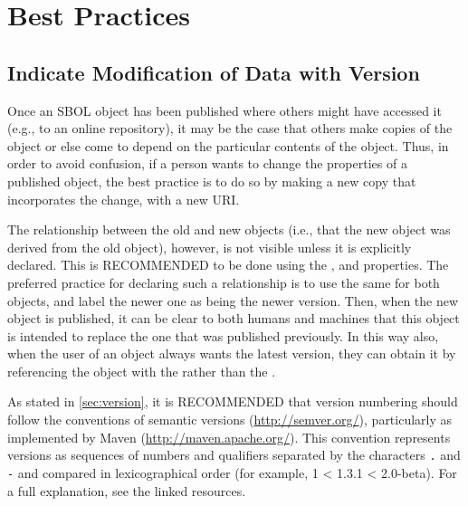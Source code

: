 \section{Best Practices}
\label{sec:bestpractices}
\subsection{Indicate Modification of Data with Version}

Once an SBOL object has been published where others might have accessed it (e.g., to an online repository), it may be the case that others make copies of the object or else come to depend on the particular contents of the object.  Thus, in order to avoid confusion, if a person wants to change the properties of a published object, the best practice is to do so by making a new copy that incorporates the change, with a new URI.

The relationship between the old and new objects (i.e., that the new object was derived from the old object), however, is not visible unless it is explicitly declared.  This is RECOMMENDED to be done using the , and  properties. The preferred practice for declaring such a relationship is to use the same  for both objects, and label the newer one as being the newer version. Then, when the new object is published, it can be clear to both humans and machines that this object is intended to replace the one that was published previously.  In this way also, when the user of an object always wants the latest version, they can obtain it by referencing the object with the  rather than the .

As stated in \ref{sec:version},  it is RECOMMENDED that version numbering should follow the conventions of semantic versions (\url{http://semver.org/}), particularly as implemented by Maven (\url{http://maven.apache.org/}).  This convention represents versions as sequences of numbers and qualifiers separated by the characters {\tt .} and {\tt -} and compared in lexicographical order (for example, 1 < 1.3.1 < 2.0-beta).  For a full explanation, see the linked resources.


